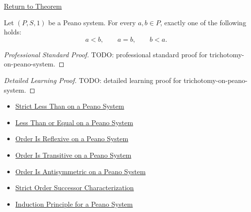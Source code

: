 \newpage
{}
\label{prf:trichotomy-on-peano-system}

\begin{remark*}[Return]
\hyperref[thm:trichotomy-on-peano-system]{Return to Theorem}
\end{remark*}

\begin{theorem*}
Let $(P,S,1)$ be a Peano system. For every $a,b \in P$, exactly one of the
following holds:
\[
a<b,\qquad a=b,\qquad b<a.
\]
\end{theorem*}

\begin{proof}[Professional Standard Proof]
\LRAProofBodyStart
TODO: professional standard proof for trichotomy-on-peano-system.
\end{proof}

\begin{proof}[Detailed Learning Proof]
\LRAProofBodyStart
TODO: detailed learning proof for trichotomy-on-peano-system.
\end{proof}

\begin{remark*}
\end{remark*}

\begin{dependencies}
\begin{itemize}
  \item \hyperref[def:strict-less-than-on-peano-system]{Strict Less Than on a Peano System}
  \item \hyperref[def:less-than-or-equal-on-peano-system]{Less Than or Equal on a Peano System}
  \item \hyperref[thm:order-reflexive-on-peano-system]{Order Is Reflexive on a Peano System}
  \item \hyperref[thm:order-transitive-on-peano-system]{Order Is Transitive on a Peano System}
  \item \hyperref[thm:order-antisymmetric-on-peano-system]{Order Is Antisymmetric on a Peano System}
  \item \hyperref[thm:strict-order-successor-characterization]{Strict Order Successor Characterization}
  \item \hyperref[thm:induction-principle-for-peano-system]{Induction Principle for a Peano System}
\end{itemize}
\end{dependencies}

\clearpage
